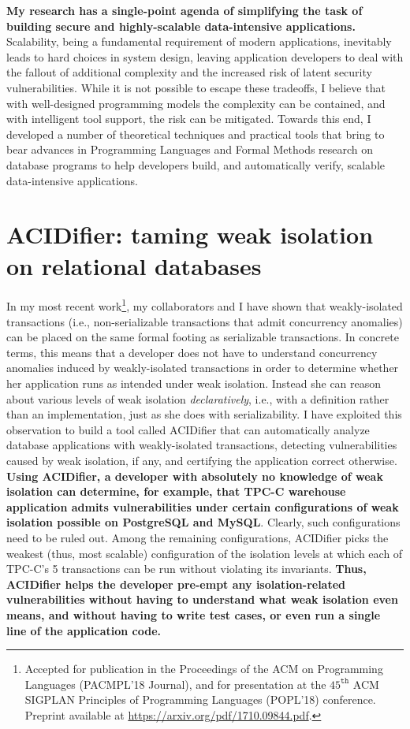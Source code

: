 {\bf My research has a single-point agenda of simplifying the task of
building secure and highly-scalable data-intensive applications.}
Scalability, being a fundamental requirement of modern applications,
inevitably leads to hard choices in system design, leaving application
developers to deal with the fallout of additional complexity and the
increased risk of latent security vulnerabilities. While it is not
possible to escape these tradeoffs, I believe that with well-designed
programming models the complexity can be contained, and with
intelligent tool support, the risk can be mitigated. Towards this end,
I developed a number of theoretical techniques and practical tools
that bring to bear advances in Programming Languages and Formal
Methods research on database programs to help developers build, and
automatically verify, scalable data-intensive applications. 


\section*{{\sc ACIDifier}: taming weak isolation on relational
databases}

In my most recent work\footnote{Accepted for publication in the
Proceedings of the ACM on Programming Languages (PACMPL'18 Journal),
and for presentation at the $45^{\texttt{th}}$ ACM SIGPLAN
Principles of Programming Languages (POPL'18) conference. Preprint
available at \url{https://arxiv.org/pdf/1710.09844.pdf}.}, my
collaborators and I have shown that weakly-isolated transactions
(i.e., non-serializable transactions that admit concurrency anomalies)
can be placed on the same formal footing as serializable transactions.
In concrete terms, this means that a developer does not have to
understand concurrency anomalies induced by weakly-isolated
transactions in order to determine whether her application runs as
intended under weak isolation. Instead she can reason about various
levels of weak isolation \emph{declaratively}, i.e., with a definition
rather than an implementation, just as she does with serializability.
I have exploited this observation to build a tool called {\sc
ACIDifier} that can automatically analyze database applications with
weakly-isolated transactions, detecting vulnerabilities caused by weak
isolation, if any, and certifying the application correct otherwise.
{\bf Using {\sc ACIDifier}, a developer with absolutely no knowledge of
weak isolation can determine, for example, that TPC-C warehouse
application admits vulnerabilities under certain configurations of
weak isolation possible on PostgreSQL and MySQL}.  Clearly, such
configurations need to be ruled out. Among the remaining
configurations, {\sc ACIDifier} picks the weakest (thus, most
scalable) configuration of the isolation levels at which each of
TPC-C's 5 transactions can be run without violating its invariants.
{\bf Thus, {\sc ACIDifier} helps the developer pre-empt any
isolation-related vulnerabilities  without having to understand what
weak isolation even means, and without having to write test cases, or
even run a single line of the application code.}

